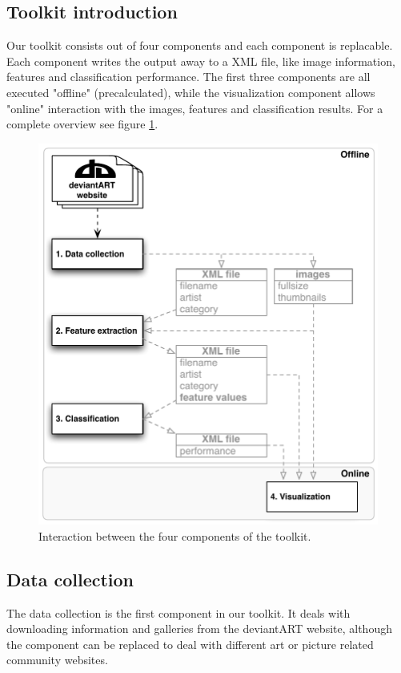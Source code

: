 \subsection{Toolkit introduction}
Our toolkit consists out of four components and each component is replacable.
Each component writes the output away to a XML file, like image information,
features and classification performance. The first three components are all executed
"offline" (precalculated), while the visualization component allows "online" interaction with the 
images, features and classification results. For a complete overview see figure \ref{fig:components}.

\begin{figure}[htb]
  \centering
  \includegraphics[width=1\linewidth]{img/components.pdf}
  \caption{Interaction between the four components of the toolkit.}
  \label{fig:components}
\end{figure}

\subsection{Data collection}
The data collection is the first component in our toolkit.
It deals with downloading information and galleries from the deviantART website,
although the component can be replaced to deal with different art or picture related community websites. 

